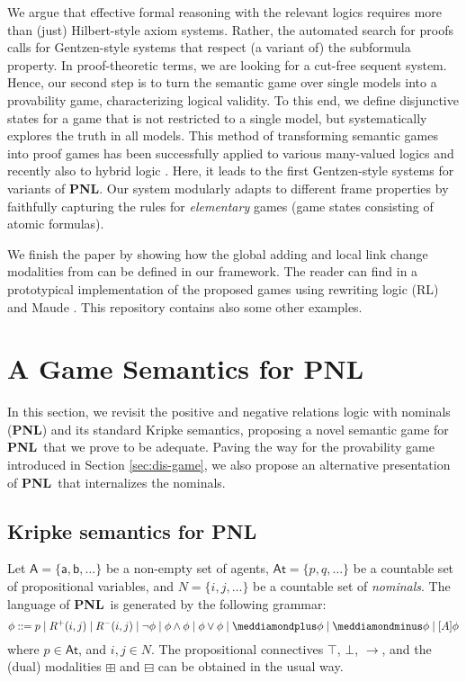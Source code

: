 \documentclass{easychair}
\newcommand{\At}{\mathsf{At}}
\newcommand{\A}{\mathsf{A}}
\newcommand{\ag}{\mathsf{a}}
\renewcommand{\b}{\mathsf{b}}
\newcommand{\dplus}{\meddiamondplus}
\newcommand{\dminus}{\meddiamondminus}
\newcommand{\bplus}{\boxplus}
\newcommand{\bminus}{\boxminus}
\newcommand{\PNL}{\textbf{PNL}}
\begin{document}
We argue that effective formal reasoning with the relevant logics requires more
than (just) Hilbert-style axiom systems. Rather, the automated search for
proofs calls for Gentzen-style systems that respect (a variant of) the
subformula property. In proof-theoretic terms, we are looking for a cut-free
sequent system. Hence, our second step is to turn the semantic game over single
models into a provability game, characterizing logical validity. To this end,
we define disjunctive states for a game that is not restricted to a single
model, but systematically explores the truth in all models. This method of
transforming semantic games into proof games has been successfully applied to
various many-valued logics
\cite{DBLP:journals/sLogica/FermullerM09,DBLP:journals/lu/FermullerLP22} and
recently also to hybrid logic \cite{DBLP:conf/wollic/Freiman21}. Here, it leads
to the first Gentzen-style systems for variants of \PNL. Our system
modularly adapts to different frame properties by faithfully capturing the rules for \emph{elementary} games 
(game states  consisting of atomic formulas). 

We finish the paper by showing how the
global adding and local link change  modalities from
\cite{DBLP:journals/logcom/PedersenSA21} can be defined in our framework.
The reader can find in \cite{tool} a 
prototypical implementation of the proposed games 
using rewriting logic (RL) and Maude \cite{DBLP:journals/jlp/Meseguer12,DBLP:journals/jlap/DuranEEMMRT20}.
This repository contains also some other examples.


 
\section{A Game Semantics for PNL}
\label{sec:pnl}



In this section, we revisit the positive and negative relations logic
\cite{DBLP:journals/jolli/XiongA20,DBLP:journals/logcom/PedersenSA21} with
nominals (\PNL) and its standard Kripke semantics, proposing a novel semantic
game  for \PNL~that we prove to be adequate. Paving the way for the provability
game introduced in Section \ref{sec:dis-game}, we also propose an alternative
presentation of \PNL~that internalizes the nominals.
 

\subsection{Kripke semantics for \PNL}\label{sec:pnl-k}
Let $\A=\{\ag,\b,\ldots\}$ be a non-empty set of agents,
$\At=\{p,q,\ldots\}$ be a countable set of propositional variables, and $N=\{i,j,\ldots\}$ be a countable set of \emph{nominals}. The language of \PNL~is generated by the following grammar:
$$\phi ::= p  \mid R^+(i,j)\mid R^-(i,j) \mid \neg \phi \mid \phi \wedge \phi \mid \phi \vee \phi \mid \dplus \phi \mid \dminus \phi\mid [A]\phi$$
where $p\in \At$, and $i,j\in N$. 
The propositional connectives $\top$, $\bot$, $\to$, and the (dual)
 modalities $\bplus$ and $\bminus$ can be obtained in the usual way. 
\end{document}
